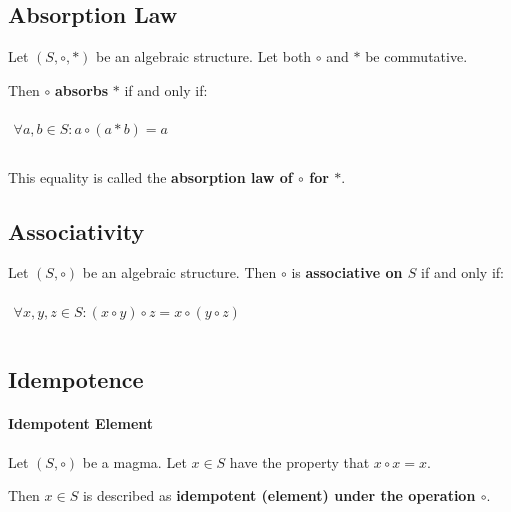 \subsection{Absorption Law}
\label{sec:absorption}

Let $(S, \circ, *)$ be an algebraic structure. Let both $\circ$ and
$*$ be commutative.

Then $\circ$ \textbf{absorbs} $*$ if and only if:

\begin{math}
  \begin{array}{c}
    \\
    \forall a, b \in S: a \circ (a * b) = a\\
    \\
  \end{array}
\end{math}

This equality is called the \textbf{absorption law of $\circ$ for
  $*$}.



\subsection{Associativity}
\label{sec:associativity}

Let $(S, \circ)$ be an algebraic structure. Then $\circ$ is
\textbf{associative on $S$} if and only if:

\begin{math}
  \begin{array}{c}
    \\
    \forall x, y, z \in S: (x \circ y) \circ z = x \circ (y \circ z)\\
    \\
  \end{array}
\end{math}


\subsection{Idempotence}
\label{sec:idempotence}

\paragraph{Idempotent Element}
Let $(S, \circ)$ be a magma. Let $x \in S$ have the property that
$ x \circ x = x$.

Then $x \in S $ is described as \textbf{idempotent (element) under the
  operation $\circ$}.

